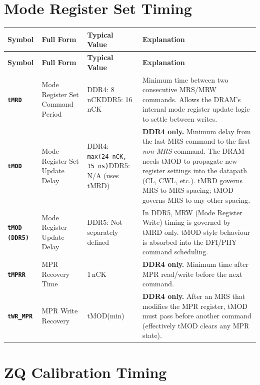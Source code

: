 \documentclass[11pt,a4paper]{article}
\newcommand{\sym}[1]{\texttt{\textbf{#1}}}
\begin{document}
\section{Mode Register Set Timing}

\begin{longtable}{L{2.2cm} L{4.8cm} L{3.5cm} L{4cm}}
\toprule
\textbf{Symbol} & \textbf{Full Form} & \textbf{Typical Value} & \textbf{Explanation} \\
\midrule
\endfirsthead
\toprule
\textbf{Symbol} & \textbf{Full Form} & \textbf{Typical Value} & \textbf{Explanation} \\
\midrule
\endhead
\bottomrule
\endfoot

\sym{tMRD} & Mode Register Set Command Period & DDR4: 8\,nCK\newline DDR5: 16\,nCK &
  Minimum time between two consecutive MRS/MRW commands.
  Allows the DRAM's internal mode register update logic to settle between writes. \\

\sym{tMOD} & Mode Register Set Update Delay & DDR4: \texttt{max(24\,nCK, 15\,ns)}\newline DDR5: N/A (uses tMRD) &
  \textbf{DDR4 only.} Minimum delay from the last MRS command to the first \textit{non-MRS} command.
  The DRAM needs tMOD to propagate new register settings into the datapath (CL, CWL, etc.).
  tMRD governs MRS-to-MRS spacing; tMOD governs MRS-to-any-other spacing. \\

\sym{tMOD (DDR5)} & Mode Register Update Delay & DDR5: Not separately defined & 
  In DDR5, MRW (Mode Register Write) timing is governed by tMRD only.
  tMOD-style behaviour is absorbed into the DFI/PHY command scheduling. \\

\sym{tMPRR} & MPR Recovery Time & 1\,nCK &
  \textbf{DDR4 only.} Minimum time after MPR read/write before the next command. \\

\sym{tWR\_MPR} & MPR Write Recovery & tMOD(min) &
  \textbf{DDR4 only.} After an MRS that modifies the MPR register, tMOD must pass
  before another command (effectively tMOD clears any MPR state). \\
\end{longtable}

\section{ZQ Calibration Timing}
\end{document}
